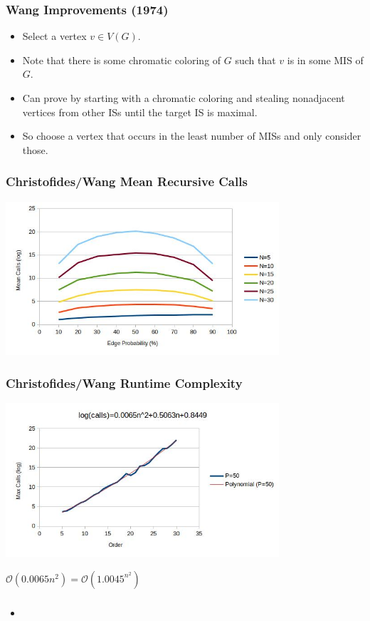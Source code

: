 \documentclass{beamer}
\newcommand{\BO}{\mathcal{O}}
\begin{document}
\begin{frame}
  \frametitle{Wang Improvements (1974)}
  \begin{itemize}
  \item Select a vertex \(v\in V(G)\).
  \item Note that there is some chromatic coloring of \(G\) such that \(v\) is in some MIS of \(G\).
  \item Can prove by starting with a chromatic coloring and stealing nonadjacent vertices from other ISs until
    the target IS is maximal.
  \item So choose a vertex that occurs in the least number of MISs and only consider those.
  \end{itemize}
\end{frame}

\begin{frame}
  \frametitle{Christofides/Wang Mean Recursive Calls}
  \begin{center}
    \includegraphics[width=4in]{../final/wang_calls}
  \end{center}
\end{frame}

\begin{frame}
  \frametitle{Christofides/Wang Runtime Complexity}
  \begin{center}
    \includegraphics[width=4in]{../final/wang_runtime}

    \bigskip

    \(\BO(0.0065n^2)=\BO(1.0045^{n^2})\)
  \end{center}
\end{frame}

\begin{frame}
  \frametitle{}
  \begin{itemize}
  \item
  \end{itemize}
\end{frame}
\end{document}
